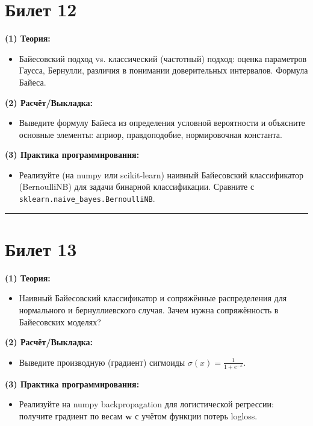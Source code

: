 \documentclass[a4paper,12pt]{article}
\begin{document}
\section*{Билет 12}
\textbf{(1) Теория:}
\begin{itemize}
  \item Байесовский подход vs. классический (частотный) подход: оценка параметров Гаусса, Бернулли, различия в понимании доверительных интервалов. Формула Байеса.
\end{itemize}

\textbf{(2) Расчёт/Выкладка:}
\begin{itemize}
  \item Выведите формулу Байеса из определения условной вероятности и объясните основные элементы: априор, правдоподобие, нормировочная константа.
\end{itemize}

\textbf{(3) Практика программирования:}
\begin{itemize}
  \item Реализуйте (на numpy или scikit-learn) наивный Байесовский классификатор (BernoulliNB) для задачи бинарной классификации. Сравните с \texttt{sklearn.naive\_bayes.BernoulliNB}.
\end{itemize}

\noindent\rule{\textwidth}{0.4pt}
\newpage

\section*{Билет 13}
\textbf{(1) Теория:}
\begin{itemize}
  \item Наивный Байесовский классификатор и сопряжённые распределения для нормального и бернуллиевского случая. Зачем нужна сопряжённость в Байесовских моделях?
\end{itemize}

\textbf{(2) Расчёт/Выкладка:}
\begin{itemize}
  \item Выведите производную (градиент) сигмоиды $\sigma(x) = \frac{1}{1 + e^{-x}}$.
\end{itemize}

\textbf{(3) Практика программирования:}
\begin{itemize}
  \item Реализуйте на numpy backpropagation для логистической регрессии: получите градиент по весам $\mathbf{w}$ с учётом функции потерь logloss.
\end{itemize}
\end{document}
